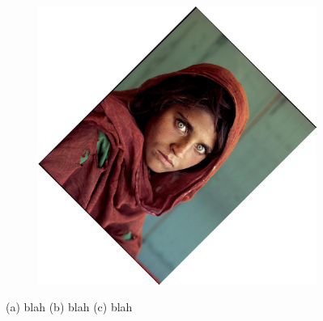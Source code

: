\documentclass{article}
\begin{document}
\begin{figure}[H]
\begin{subfigure}{.3\textwidth}
        \subcaption{}
    \end{subfigure}
    \begin{subfigure}{.3\textwidth}
        \centering
        \includegraphics[scale=0.04]{q1/output/similar_1_2_2.jpg}
        \subcaption{}
    \end{subfigure}
    \caption{(a) blah (b) blah (c) blah}
\end{figure}
\end{document}
